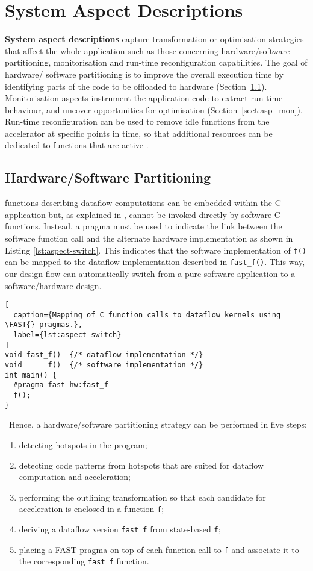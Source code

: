 \section{System Aspect Descriptions}
{\bf System aspect descriptions} capture transformation
or optimisation strategies that affect the whole application such as
those concerning hardware/software partitioning, monitorisation and
run-time reconfiguration capabilities. The goal of hardware/ software
partitioning is to improve the overall execution time by identifying
parts of the code to be offloaded to hardware
(Section~\ref{sect:asp_hsp}). Monitorisation aspects instrument the
application code to extract run-time behaviour, and uncover
opportunities for optimisation (Section~\ref{sect:asp_mon}).
Run-time reconfiguration can be used to remove idle functions
from the accelerator at specific points in time, so that
additional resources can be dedicated to functions that are
active \cite{Xinyu:Qiwei:Luk:Qiang:Pell:2012}.


\subsection{Hardware/Software Partitioning}
\label{sect:asp_hsp}
\FAST{} functions describing dataflow computations can be embedded
within the C application but, as explained in
, cannot be invoked directly by software C
functions. Instead, a \FAST{} pragma must be used to indicate the
link between the software function call and the alternate hardware
implementation as shown in Listing \ref{lst:aspect-switch}. This
indicates that the software implementation of \texttt{f()} can be
mapped to the dataflow implementation described in
\texttt{fast\_f()}. This way, our design-flow can automatically switch
from a pure software application to a software/hardware design.

\lstset{style=MaxC}
\begin{lstlisting}[
  caption={Mapping of C function calls to dataflow kernels using \FAST{} pragmas.},
  label={lst:aspect-switch}
]
void fast_f()  {/* dataflow implementation */}
void      f()  {/* software implementation */}
int main() {
  #pragma fast hw:fast_f
  f();
}
\end{lstlisting}
\
Hence, a hardware/software partitioning strategy can be performed in
five steps:
\begin{enumerate}
  \item detecting hotspots in the program;
  \item detecting code patterns from hotspots that are suited for
    dataflow computation and acceleration;
  \item performing the outlining transformation so that each
    candidate for acceleration is enclosed in a function \texttt{f};
  \item deriving a dataflow version \texttt{fast\_f} from state-based
    \texttt{f};
  \item placing a FAST pragma on top of each function call to
    \texttt{f} and associate it to the corresponding \texttt{fast\_f}
    function.
\end{enumerate}

